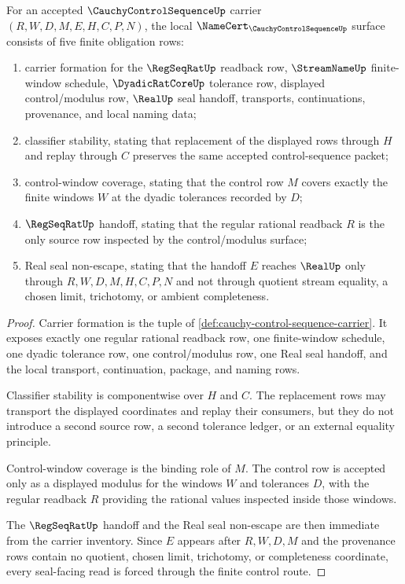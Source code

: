 \begin{theorem}
\label{thm:cauchy-control-sequence-namecert-obligations}
For an accepted $\CauchyControlSequenceUp$ carrier $(R,W,D,M,E,H,C,P,N)$, the local $\NameCert_{\CauchyControlSequenceUp}$ surface consists of five finite obligation rows:
\begin{enumerate}
\item carrier formation for the $\RegSeqRatUp$ readback row, $\StreamNameUp$ finite-window schedule, $\DyadicRatCoreUp$ tolerance row, displayed control/modulus row, $\RealUp$ seal handoff, transports, continuations, provenance, and local naming data;
\item classifier stability, stating that replacement of the displayed rows through $H$ and replay through $C$ preserves the same accepted control-sequence packet;
\item control-window coverage, stating that the control row $M$ covers exactly the finite windows $W$ at the dyadic tolerances recorded by $D$;
\item $\RegSeqRatUp$ handoff, stating that the regular rational readback $R$ is the only source row inspected by the control/modulus surface;
\item Real seal non-escape, stating that the handoff $E$ reaches $\RealUp$ only through $R,W,D,M,H,C,P,N$ and not through quotient stream equality, a chosen limit, trichotomy, or ambient completeness.
\end{enumerate}
\end{theorem}
\begin{proof}
Carrier formation is the tuple of \autoref{def:cauchy-control-sequence-carrier}. It exposes exactly one regular rational readback row, one finite-window schedule, one dyadic tolerance row, one control/modulus row, one Real seal handoff, and the local transport, continuation, package, and naming rows.

Classifier stability is componentwise over $H$ and $C$. The replacement rows may transport the displayed coordinates and replay their consumers, but they do not introduce a second source row, a second tolerance ledger, or an external equality principle.

Control-window coverage is the binding role of $M$. The control row is accepted only as a displayed modulus for the windows $W$ and tolerances $D$, with the regular readback $R$ providing the rational values inspected inside those windows.

The $\RegSeqRatUp$ handoff and the Real seal non-escape are then immediate from the carrier inventory. Since $E$ appears after $R,W,D,M$ and the provenance rows contain no quotient, chosen limit, trichotomy, or completeness coordinate, every seal-facing read is forced through the finite control route.
\end{proof}

